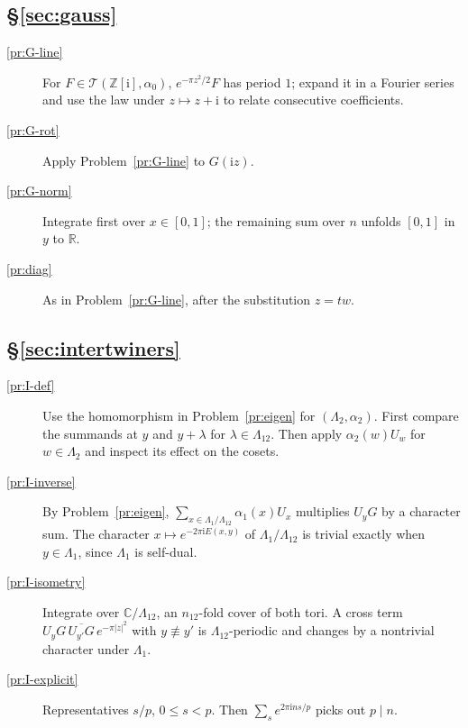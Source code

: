 \documentclass[reqno]{amsart}
\theoremstyle{definition}
\theoremstyle{plain}
\newcommand{\Z}{\mathbb{Z}}
\newcommand{\R}{\mathbb{R}}
\newcommand{\C}{\mathbb{C}}
\newcommand{\ii}{\mathrm{i}}
\begin{document}
\subsection*{\S\ref{sec:gauss}}
\begin{description}
\item[\ref{pr:G-line}] For \(F \in \mathcal{T}(\Z[\ii],\alpha_0)\), \(e^{-\pi z^2/2}F\) has period \(1\); expand it in a Fourier series and use the law under \(z \mapsto z + \ii\) to relate consecutive coefficients.
\item[\ref{pr:G-rot}] Apply Problem~\ref{pr:G-line} to \(G(\ii z)\).
\item[\ref{pr:G-norm}] Integrate first over \(x \in [0,1]\); the remaining sum over \(n\) unfolds \([0,1]\) in \(y\) to \(\R\).
\item[\ref{pr:diag}] As in Problem~\ref{pr:G-line}, after the substitution \(z = tw\).
\end{description}

\subsection*{\S\ref{sec:intertwiners}}
\begin{description}
\item[\ref{pr:I-def}] Use the homomorphism in Problem~\ref{pr:eigen} for \((\Lambda_2,\alpha_2)\).  First compare the summands at \(y\) and \(y+\lambda\) for \(\lambda\in\Lambda_{12}\).  Then apply \(\alpha_2(w)U_w\) for \(w\in\Lambda_2\) and inspect its effect on the cosets.
\item[\ref{pr:I-inverse}] By Problem~\ref{pr:eigen}, \(\sum_{x \in \Lambda_1/\Lambda_{12}} \alpha_1(x)U_x\) multiplies \(U_yG\) by a character sum.  The character \(x \mapsto e^{-2\pi\ii E(x,y)}\) of \(\Lambda_1/\Lambda_{12}\) is trivial exactly when \(y \in \Lambda_1\), since \(\Lambda_1\) is self-dual.
\item[\ref{pr:I-isometry}] Integrate over \(\C/\Lambda_{12}\), an \(n_{12}\)-fold cover of both tori.  A cross term \(U_yG\,\overline{U_{y'}G}\,e^{-\pi\lvert z\rvert^2}\) with \(y \not\equiv y'\) is \(\Lambda_{12}\)-periodic and changes by a nontrivial character under \(\Lambda_1\).
\item[\ref{pr:I-explicit}] Representatives \(s/p\), \(0 \le s < p\).  Then \(\sum_s e^{2\pi\ii ns/p}\) picks out \(p \mid n\).
\end{description}
\end{document}
